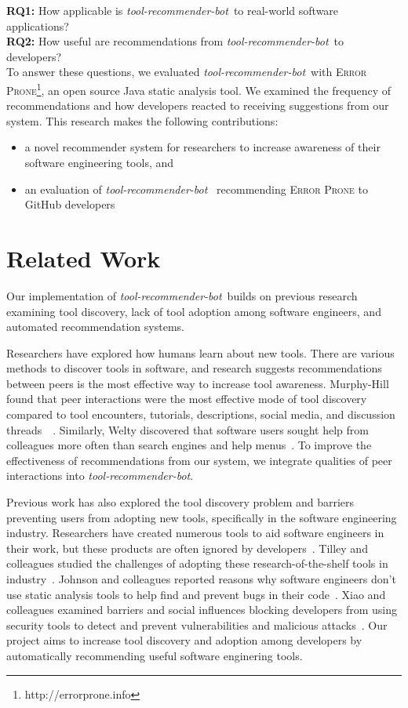 \documentclass[conference]{IEEEtran}
\newcommand{\tool}{\textsl{tool-recommender-bot}}
\begin{document}
\noindent
\textbf{RQ1:} How applicable is \tool~to real-world software applications?  \\ 
\textbf{RQ2:} How useful are recommendations from \tool~to developers?  \\

To answer these questions, we evaluated \tool~with \textsc{Error Prone}\footnote{http://errorprone.info}, an open source Java static analysis tool. We examined the frequency of recommendations and how developers reacted to receiving suggestions from our system. This research makes the following contributions:

\begin{itemize}
 \item a novel recommender system for researchers to increase awareness of their software engineering tools, and
 \item an evaluation of \tool~ recommending \textsc{Error Prone} to GitHub developers
 \end{itemize}

\section{Related Work}
Our implementation of \tool~builds on previous research examining tool discovery, lack of tool adoption among software engineers, and automated recommendation systems.

Researchers have explored how humans learn about new tools. There are various methods to discover tools in software, and research suggests recommendations between peers is the most effective way to increase tool awareness. Murphy-Hill found that peer interactions were the most effective mode of tool discovery compared to tool encounters, tutorials, descriptions, social media, and discussion threads~\cite{MurphyHill2011PeerInteraction}~\cite{Murphy-Hill2015HowDoUsers}. Similarly, Welty discovered that software users sought help from colleagues more often than search engines and help menus~\cite{Welty2011Help}. To improve the effectiveness of recommendations from our system, we integrate qualities of peer interactions into \tool.

Previous work has also explored the tool discovery problem and barriers preventing users from adopting new tools, specifically in the software engineering industry. Researchers have created numerous tools to aid software engineers in their work, but these products are often ignored by developers~\cite{Ivanov2017Gaps}. Tilley and colleagues studied the challenges of adopting these research-of-the-shelf tools in industry~\cite{Tilley2003ROTS}. Johnson and colleagues reported reasons why software engineers don't use static analysis tools to help find and prevent bugs in their code~\cite{Johnson2013Why}. Xiao and colleagues examined barriers and social influences blocking developers from using security tools to detect and prevent vulnerabilities and malicious attacks~\cite{Xiao2014Security}. Our project aims to increase tool discovery and adoption among developers by automatically recommending useful software enginering tools.
\end{document}
